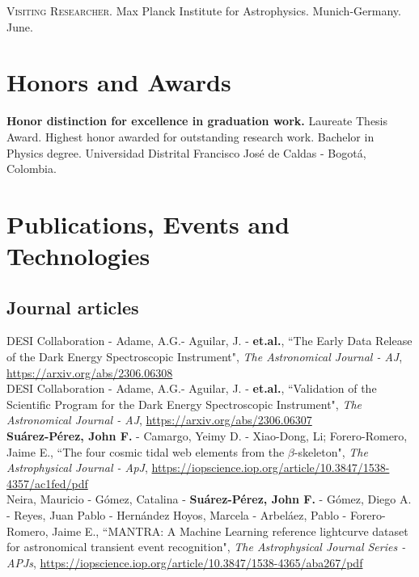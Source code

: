 \documentclass[10pt, a4paper]{article}
\newcommand{\years}[1]{\marginnote{\scriptsize #1}}
\begin{document}
\years{2019}\textsc{Visiting Researcher}. Max Planck Institute for Astrophysics. Munich-Germany. 
{June}.\\

\section*{Honors and Awards}
\noindent
\years{2014}\textbf{Honor distinction for excellence in graduation work.} Laureate Thesis Award. 
Highest honor awarded for outstanding research work. Bachelor in Physics degree. Universidad 
Distrital Francisco José de Caldas - Bogotá, Colombia.





\section*{Publications, Events and Technologies}

\subsection*{Journal articles}
\noindent
\years{2023}DESI Collaboration - Adame, A.G.- Aguilar, J. - \textbf{et.al.}, “The Early Data Release 
of the Dark Energy Spectroscopic Instrument", \emph{The Astronomical Journal - AJ}, 
\url{https://arxiv.org/abs/2306.06308} 
\\

\years{2023}DESI Collaboration - Adame, A.G.- Aguilar, J. - \textbf{et.al.}, “Validation of the 
Scientific Program for the Dark Energy Spectroscopic Instrument", \emph{The Astronomical Journal - 
AJ}, 
\url{https://arxiv.org/abs/2306.06307} 
\\

\years{2021}\textbf{Suárez-Pérez, John F.} - Camargo, Yeimy D. - Xiao-Dong, Li; Forero-Romero, 
Jaime E., “The four cosmic tidal web elements from the $\beta$-skeleton", \emph{The Astrophysical 
Journal - ApJ}, \url{https://iopscience.iop.org/article/10.3847/1538-4357/ac1fed/pdf} 
\\

\years{2020}Neira, Mauricio - Gómez, Catalina - \textbf{Suárez-Pérez, John F.} - Gómez, Diego A. - Reyes, Juan Pablo - Hernández Hoyos, Marcela - Arbeláez, Pablo - Forero-Romero, Jaime E., “MANTRA: A Machine Learning reference lightcurve dataset for astronomical transient event recognition", \emph{The Astrophysical Journal Series - APJs}, \url{https://iopscience.iop.org/article/10.3847/1538-4365/aba267/pdf} 
\\
\end{document}
